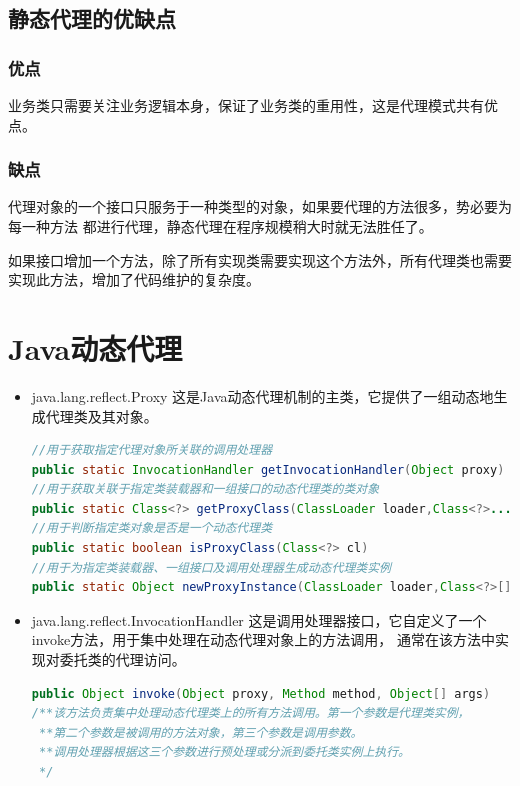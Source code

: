 \subsection{静态代理的优缺点}
\subsubsection{优点}
业务类只需要关注业务逻辑本身，保证了业务类的重用性，这是代理模式共有优点。
\subsubsection{缺点}
代理对象的一个接口只服务于一种类型的对象，如果要代理的方法很多，势必要为每一种方法
都进行代理，静态代理在程序规模稍大时就无法胜任了。
\par 如果接口增加一个方法，除了所有实现类需要实现这个方法外，所有代理类也需要实现此方法，增加了代码维护的复杂度。

\section{Java动态代理}
\begin{itemize}
	\item java.lang.reflect.Proxy
	\subitem 这是Java动态代理机制的主类，它提供了一组动态地生成代理类及其对象。
	\begin{lstlisting}[language=java]
//用于获取指定代理对象所关联的调用处理器
public static InvocationHandler getInvocationHandler(Object proxy)
//用于获取关联于指定类装载器和一组接口的动态代理类的类对象
public static Class<?> getProxyClass(ClassLoader loader,Class<?>... interfaces)
//用于判断指定类对象是否是一个动态代理类
public static boolean isProxyClass(Class<?> cl)
//用于为指定类装载器、一组接口及调用处理器生成动态代理类实例
public static Object newProxyInstance(ClassLoader loader,Class<?>[] interfaces,InvocationHandler h)
	\end{lstlisting}
	\item java.lang.reflect.InvocationHandler
	\subitem 这是调用处理器接口，它自定义了一个invoke方法，用于集中处理在动态代理对象上的方法调用，
	通常在该方法中实现对委托类的代理访问。
	\begin{lstlisting}[language=java]
public Object invoke(Object proxy, Method method, Object[] args)
/**该方法负责集中处理动态代理类上的所有方法调用。第一个参数是代理类实例，
 **第二个参数是被调用的方法对象，第三个参数是调用参数。
 **调用处理器根据这三个参数进行预处理或分派到委托类实例上执行。
 */
	\end{lstlisting}
\end{itemize}
